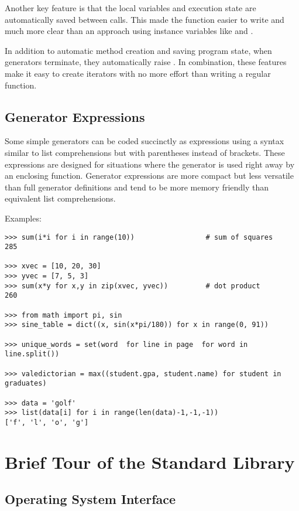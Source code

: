 \documentclass{manual}
\begin{document}
Another key feature is that the local variables and execution state
are automatically saved between calls.  This made the function easier to write
and much more clear than an approach using instance variables like
 and .

In addition to automatic method creation and saving program state, when
generators terminate, they automatically raise .
In combination, these features make it easy to create iterators with no
more effort than writing a regular function.

\section{Generator Expressions\label{genexps}}

Some simple generators can be coded succinctly as expressions using a syntax
similar to list comprehensions but with parentheses instead of brackets.  These
expressions are designed for situations where the generator is used right
away by an enclosing function.  Generator expressions are more compact but
less versatile than full generator definitions and tend to be more memory
friendly than equivalent list comprehensions.

Examples:

\begin{verbatim}
>>> sum(i*i for i in range(10))                 # sum of squares
285

>>> xvec = [10, 20, 30]
>>> yvec = [7, 5, 3]
>>> sum(x*y for x,y in zip(xvec, yvec))         # dot product
260

>>> from math import pi, sin
>>> sine_table = dict((x, sin(x*pi/180)) for x in range(0, 91))

>>> unique_words = set(word  for line in page  for word in line.split())

>>> valedictorian = max((student.gpa, student.name) for student in graduates)

>>> data = 'golf'
>>> list(data[i] for i in range(len(data)-1,-1,-1))
['f', 'l', 'o', 'g']

\end{verbatim}



\chapter{Brief Tour of the Standard Library \label{briefTour}}


\section{Operating System Interface\label{os-interface}}
\end{document}
